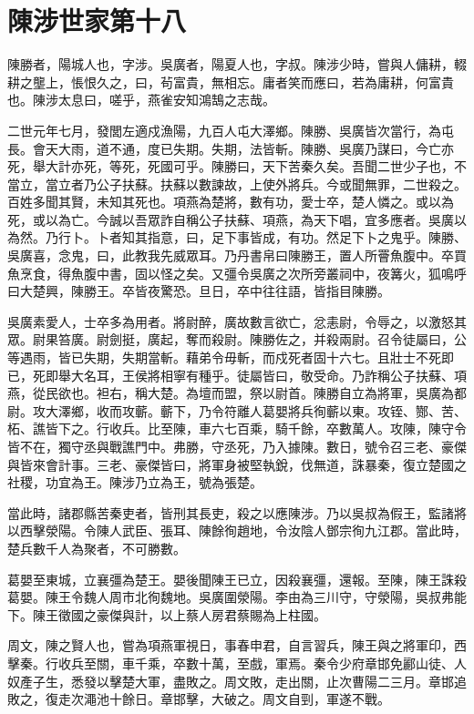 \chapter{陳涉世家第十八}

陳勝者，陽城人也，字涉。吳廣者，陽夏人也，字叔。陳涉少時，嘗與人傭耕，輟耕之壟上，悵恨久之，曰，茍富貴，無相忘。庸者笑而應曰，若為庸耕，何富貴也。陳涉太息曰，嗟乎，燕雀安知鴻鵠之志哉。

二世元年七月，發閭左適戍漁陽，九百人屯大澤鄉。陳勝、吳廣皆次當行，為屯長。會天大雨，道不通，度已失期。失期，法皆斬。陳勝、吳廣乃謀曰，今亡亦死，舉大計亦死，等死，死國可乎。陳勝曰，天下苦秦久矣。吾聞二世少子也，不當立，當立者乃公子扶蘇。扶蘇以數諫故，上使外將兵。今或聞無罪，二世殺之。百姓多聞其賢，未知其死也。項燕為楚將，數有功，愛士卒，楚人憐之。或以為死，或以為亡。今誠以吾眾詐自稱公子扶蘇、項燕，為天下唱，宜多應者。吳廣以為然。乃行卜。卜者知其指意，曰，足下事皆成，有功。然足下卜之鬼乎。陳勝、吳廣喜，念鬼，曰，此教我先威眾耳。乃丹書帛曰陳勝王，置人所罾魚腹中。卒買魚烹食，得魚腹中書，固以怪之矣。又彊令吳廣之次所旁叢祠中，夜篝火，狐鳴呼曰大楚興，陳勝王。卒皆夜驚恐。旦日，卒中往往語，皆指目陳勝。

吳廣素愛人，士卒多為用者。將尉醉，廣故數言欲亡，忿恚尉，令辱之，以激怒其眾。尉果笞廣。尉劍挺，廣起，奪而殺尉。陳勝佐之，并殺兩尉。召令徒屬曰，公等遇雨，皆已失期，失期當斬。藉弟令毋斬，而戍死者固十六七。且壯士不死即已，死即舉大名耳，王侯將相寧有種乎。徒屬皆曰，敬受命。乃詐稱公子扶蘇、項燕，從民欲也。袒右，稱大楚。為壇而盟，祭以尉首。陳勝自立為將軍，吳廣為都尉。攻大澤鄉，收而攻蘄。蘄下，乃令符離人葛嬰將兵徇蘄以東。攻铚、酂、苦、柘、譙皆下之。行收兵。比至陳，車六七百乘，騎千餘，卒數萬人。攻陳，陳守令皆不在，獨守丞與戰譙門中。弗勝，守丞死，乃入據陳。數日，號令召三老、豪傑與皆來會計事。三老、豪傑皆曰，將軍身被堅執銳，伐無道，誅暴秦，復立楚國之社稷，功宜為王。陳涉乃立為王，號為張楚。

當此時，諸郡縣苦秦吏者，皆刑其長吏，殺之以應陳涉。乃以吳叔為假王，監諸將以西擊滎陽。令陳人武臣、張耳、陳餘徇趙地，令汝陰人鄧宗徇九江郡。當此時，楚兵數千人為聚者，不可勝數。

葛嬰至東城，立襄彊為楚王。嬰後聞陳王已立，因殺襄彊，還報。至陳，陳王誅殺葛嬰。陳王令魏人周市北徇魏地。吳廣圍滎陽。李由為三川守，守滎陽，吳叔弗能下。陳王徵國之豪傑與計，以上蔡人房君蔡賜為上柱國。

周文，陳之賢人也，嘗為項燕軍視日，事春申君，自言習兵，陳王與之將軍印，西擊秦。行收兵至關，車千乘，卒數十萬，至戲，軍焉。秦令少府章邯免酈山徒、人奴產子生，悉發以擊楚大軍，盡敗之。周文敗，走出關，止次曹陽二三月。章邯追敗之，復走次澠池十餘日。章邯擊，大破之。周文自剄，軍遂不戰。

